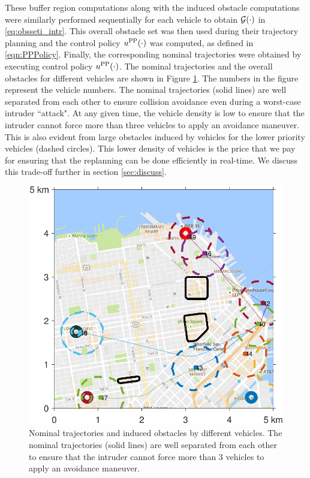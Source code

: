 These buffer region computations along with the induced obstacle computations were similarly performed sequentially for each vehicle to obtain $\mathcal{G}(\cdot)$ in \eqref{eq:obsseti_intr}. This overall obstacle set was then used during their trajectory planning and the control policy $u^{\text{PP}}(\cdot)$ was computed, as defined in \eqref{eqn:PPPolicy}. Finally, the corresponding nominal trajectories were obtained by executing control policy $u^{\text{PP}}(\cdot)$. %
The nominal trajectories and the overall obstacles for different vehicles are shown in Figure \ref{fig:trajObsSim}. The numbers in the figure represent the vehicle numbers. The nominal trajectories (solid lines) are well separated from each other to ensure collision avoidance even during a worst-case intruder ``attack". At any given time, the vehicle density is low to ensure that the intruder cannot force more than three vehicles to apply an avoidance maneuver. This is also evident from large obstacles induced by vehicles for the lower priority vehicles (dashed circles). This lower density of vehicles is the price that we pay for ensuring that the replanning can be done efficiently in real-time. We discuss this trade-off further in section \ref{sec:discuss}.
\begin{figure}
  \centering
  \includegraphics[width=0.8\columnwidth]{figs/nomTraj}
  \caption{Nominal trajectories and induced obstacles by different vehicles. The nominal trajectories (solid lines) are well separated from each other to ensure that the intruder cannot force more than 3 vehicles to apply an avoidance maneuver.}
  \label{fig:trajObsSim}
\end{figure}

